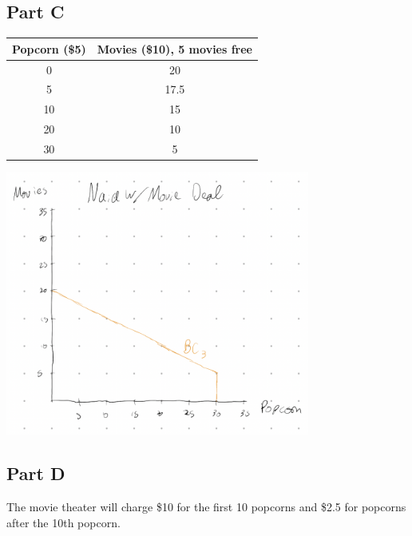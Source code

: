 \documentclass[8pt]{extarticle}
\begin{document}
{\subsection*{Part C}
\begin{center}
	\begin{tabular}{c|c}
		Popcorn (\$5) &	Movies (\$10), 5 movies free \\
		\hline
		0 & 20 \\
		5 & 17.5 \\
		10 & 15 \\
		20 & 10 \\
		30 & 5 
	\end{tabular}
\end{center}
\begin{center}
	\includegraphics[width=10cm]{HW3Q6C}
\end{center}
\subsection*{Part D}
The movie theater will charge \$10 for the first 10 popcorns and \$2.5 for popcorns after the 10th popcorn.
}
\end{document}
